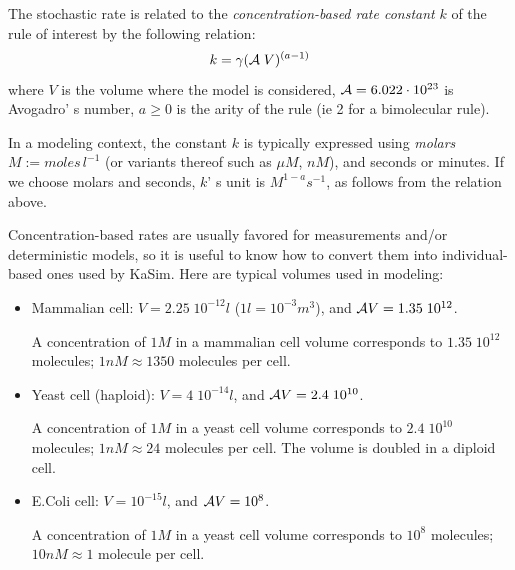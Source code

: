 \documentclass[11pt]{book}
\def\ga{\gamma}
\def\ie{ie }
\def\mit#1{{\mathit #1}}
\begin{document}
The stochastic rate is related to the \emph{concentration-based rate constant} $k$ of the rule of interest by the following relation:
%
%
\begin{equation}\label{stochrate}
k = \ga{({\cal A}\; V)^{(a-1)}} %
\end{equation}
where 
$V$ is the volume where the model is considered,
${\cal A}= 6.022\cdot 10^{23}$ is Avogadro' s number, %
$a\geq0$ is the arity of the rule (\ie 2 for a bimolecular rule).

In a modeling context, the constant $k$ is typically expressed using \emph{molars} $M:=\mit{moles}\,l^{-1}$ (or variants thereof such
as $\mu M$, $nM$), and seconds or minutes. If we choose molars and seconds, $k$' s unit is $\mathit{M}^{1-a}\mathit{s}^{-1}$, as 
follows from the relation above.

Concentration-based rates are usually favored for measurements and/or deterministic models, so it is useful to know how to convert them into
individual-based ones used by KaSim. 
Here are typical volumes used in modeling:
\begin{itemize}
\item Mammalian cell: $V=2.25\; 10^{-12}l$  ($1l=10^{-3}m^3$), and ${\cal A}V=1.35\; 10^{12}$.

A concentration of $1M$ in a mammalian cell volume corresponds to $1.35\; 10^{12}$ molecules; $1nM\approx 1350$ molecules per cell.

\item
Yeast cell (haploid): $V=4\; 10^{-14}l$, and ${\cal A}V=2.4\; 10^{10}$.

A concentration of $1M$ in a yeast cell volume corresponds to $2.4\; 10^{10}$ molecules; $1nM\approx 24$ molecules per cell. The volume is doubled in a diploid cell.
\item
E.\@ Coli cell: $V=10^{-15}l$, and ${\cal A}V=10^{8}$. 

A concentration of $1M$ in a yeast cell volume corresponds to $10^{8}$ molecules; $10nM\approx 1$ molecule per cell.
\end{itemize}
\end{document}
